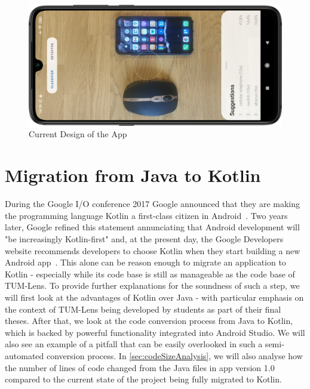 \documentclass[
			   fontsize=11pt,
               paper=a4,
               bibliography=totoc,
               idxtotoc,
               headsepline,
               footsepline,
               footinclude=false,
               BCOR=12mm,
               DIV=13,
               openany,   %
               oneside    %
               ]
               {scrbook}
\begin{document}
\bigskip

\begin{figure}[H]
	\centering
	\includegraphics[width=\textwidth]{figures/app_class_new_rot.png}
	\caption[Current Design of the App]{Current Design of the App}
	\label{fig:designUpdate}
\end{figure}

\chapter{Migration from Java to Kotlin}

During the Google I/O conference 2017 Google announced that they are making the programming language Kotlin a first-class citizen in Android~\cite{googleIO17}. Two years later, Google refined this statement annunciating that Android development will "be increasingly Kotlin-first" and, at the present day, the Google Developers website recommends developers to choose Kotlin when they start building a new Android app~\cite{kotlinFirst}. This alone can be reason enough to migrate an application to Kotlin - especially while its code base is still as manageable as the code base of TUM-Lens. To provide further explanations for the soundness of such a step, we will first look at the advantages of Kotlin over Java - with particular emphasis on the context of TUM-Lens being developed by students as part of their final theses. After that, we look at the code conversion process from Java to Kotlin, which is backed by powerful functionality integrated into Android Studio. We will also see an example of a pitfall that can be easily overlooked in such a semi-automated conversion process. In \autoref{sec:codeSizeAnalysis}, we will also analyse how the number of lines of code changed from the Java files in app version 1.0 compared to the current state of the project being fully migrated to Kotlin.
\end{document}

